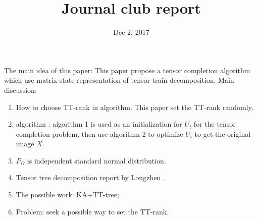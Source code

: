 \documentclass[UTF8]{article}
\begin{document}
	\title{Journal club report}	
	\date{Dec 2, 2017} 
	\maketitle
	The main idea of this paper:
	This paper propose a tensor completion algorithm which use matrix state representation of tensor train decomposition. 
	Main discussion:
	  
	\begin{enumerate}[1)]
		\item How to choose TT-rank in algorithm. This paper set the TT-rank randomly.
		\item algorithm : algorithm 1 is used as an initialization for $U_i$ for the tensor completion problem, then use algorithm 2 to optimize $U_i$ to get the original image $X$.
		\item $P_Ω$ is independent standard normal distribution.
		\item Tensor tree decomposition report by Longzhen .
		\item The possible work:  KA+TT-tree;
		\item Problem: seek a possible way to set the TT-rank.
     \end{enumerate}
\end{document}
